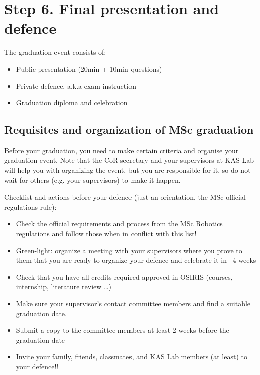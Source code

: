 \section{Step 6. Final presentation and defence }
The graduation event consists of:

\begin{itemize}
    \item Public presentation (20min + 10min questions)
    \item Private defence, a.k.a exam instruction
    \item Graduation diploma and celebration
\end{itemize}

\subsection{Requisites and organization of MSc graduation}

Before your graduation, you need to make certain criteria and organise your graduation event. Note that the CoR secretary and your supervisors at KAS Lab will help you with organizing the event, but you are responsible for it, so do not wait for others (e.g. your supervisors) to make it happen.

Checklist and actions before your defence (just an orientation, the MSc official regulations rule):

\begin{itemize}
    \item Check the official requirements and process from the MSc Robotics regulations and follow those when in conflict with this list!
    \item Green-light: organize a meeting with your supervisors where you prove to them that you are ready to organize your defence and celebrate it in ~4 weeks
    \item Check that you have all credits required approved in OSIRIS (courses, internship, literature review \dots)
    \item Make sure your supervisor's contact committee members and find a suitable graduation date.
    \item Submit a copy to the committee members at least 2 weeks before the graduation date
    \item Invite your family, friends, classmates, and KAS Lab members (at least) to your defence!!
\end{itemize}





